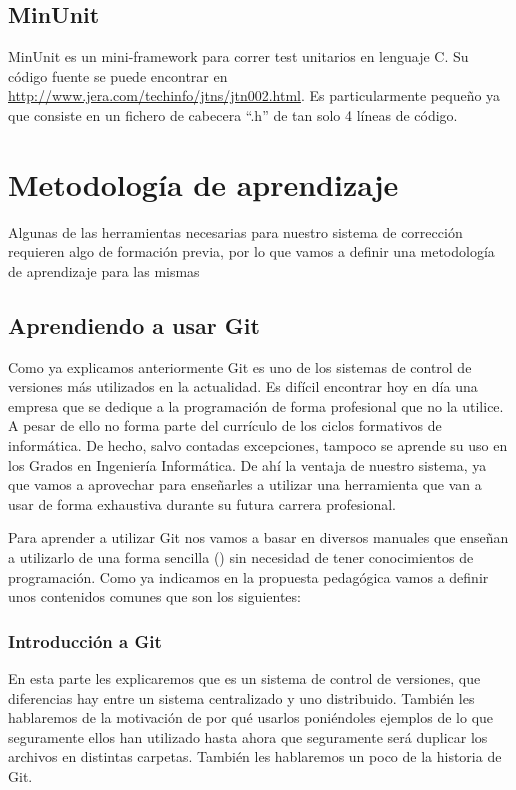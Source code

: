 \subsection{MinUnit}

MinUnit es un mini-framework para correr test unitarios en lenguaje C. Su código fuente se puede encontrar en \url{http://www.jera.com/techinfo/jtns/jtn002.html}. Es particularmente pequeño ya que consiste en un fichero de cabecera ``.h'' de tan solo 4 líneas de código.

\section{Metodología de aprendizaje}

Algunas de las herramientas necesarias para nuestro sistema de corrección requieren algo de formación previa, por lo que vamos a definir una metodología de aprendizaje para las mismas

\subsection{Aprendiendo a usar Git}

Como ya explicamos anteriormente Git es uno de los sistemas de control de versiones más utilizados en la actualidad. Es difícil encontrar hoy en día una empresa que se dedique a la programación de forma profesional que no la utilice. A pesar de ello no forma parte del currículo de los ciclos formativos de informática. De hecho, salvo contadas excepciones, tampoco se aprende su uso en los Grados en Ingeniería Informática. De ahí la ventaja de nuestro sistema, ya que vamos a aprovechar para enseñarles a utilizar una herramienta que van a usar de forma exhaustiva durante su futura carrera profesional.

\bigskip
Para aprender a utilizar Git nos vamos a basar en diversos manuales que enseñan a utilizarlo de una forma sencilla (\cite{popov_control_2012}) sin necesidad de tener conocimientos de programación. Como ya indicamos en la propuesta pedagógica vamos a definir unos contenidos comunes que son los siguientes:

\subsubsection{Introducción a Git}

En esta parte les explicaremos que es un sistema de control de versiones, que diferencias hay entre un sistema centralizado y uno distribuido. También les hablaremos de la motivación de por qué usarlos poniéndoles ejemplos de lo que seguramente ellos han utilizado hasta ahora que seguramente será duplicar los archivos en distintas carpetas. También les hablaremos un poco de la historia de Git.

